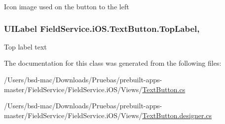 Icon image used on the button to the left 

\hypertarget{class_field_service_1_1i_o_s_1_1_text_button_a7f7b25febb01096323e84c69a765bac1}{
\subsubsection[{Top\+Label}]{\setlength{\rightskip}{0pt plus 5cm}U\+I\+Label Field\+Service.\+i\+O\+S.\+Text\+Button.\+Top\+Label\hspace{0.3cm}{\ttfamily [get]}, {\ttfamily [set]}}}\label{class_field_service_1_1i_o_s_1_1_text_button_a7f7b25febb01096323e84c69a765bac1}


Top label text 



The documentation for this class was generated from the following files\+:\begin{DoxyCompactItemize}
\item 
/\+Users/bsd-\/mac/\+Downloads/\+Pruebas/prebuilt-\/apps-\/master/\+Field\+Service/\+Field\+Service.\+i\+O\+S/\+Views/\hyperlink{_text_button_8cs}{Text\+Button.\+cs}\item 
/\+Users/bsd-\/mac/\+Downloads/\+Pruebas/prebuilt-\/apps-\/master/\+Field\+Service/\+Field\+Service.\+i\+O\+S/\+Views/\hyperlink{_text_button_8designer_8cs}{Text\+Button.\+designer.\+cs}\end{DoxyCompactItemize}
